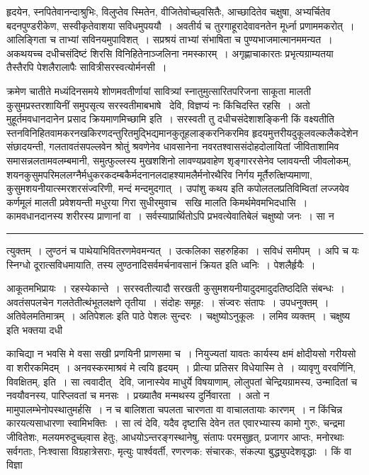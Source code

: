 \documentclass[11pt, openany]{book}
\begin{document}

\newpage
\lfoot{}

\noindent
हृदयेन, स्नपितेवानन्दाश्रुभिः, विलुप्तेव स्मितेन, वीजितेवोच्छ्वसितैः, आच्छादितेव चक्षुषा, अभ्यर्चितेव बदनपुण्डरीकेण, सस्वीकृतेवाशया सविधमुपययौ~। अवतीर्य च तुरगाहूरादेवावनतेन मूर्ध्ना प्रणाममकरोत्~। आलिङ्गिता च ताभ्यां सविनयमुपाविशत्~। सप्रश्रयं ताभ्यां संभाषिता च पुण्यभाजमात्मानममन्यत~। अकथयच्च दधीचसंदिष्टं शिरसि विनिहितेनाञ्जलिना नमस्कारम्~। अगृह्णाचाकारतः प्रभृत्यग्राम्यतया तैस्तैरपि पेशलैरालापैः सावित्रीसरस्वत्योर्मनसी~।

क्रमेण चातीते मध्यंदिनसमये शोणमवतीर्णायां सावित्र्यां स्नातुमुत्सारितपरिजना साकूता मालती कुसुमप्रस्तरशायिनीं समुपसृत्य सरस्वतीमाबभाषे \textendash\ {\haq देवि, विज्ञप्यं नः किंचिदस्ति रहसि~। अतो मुहूर्तमवधानदानेन प्रसाद क्रियमाणमिच्छामि} इति~। सरस्वती तु दधीचसंदेशाशङ्किनी किं वक्ष्यतीति स्तनविनिहितवामकरनखकिरणदन्तुरितमुद्भिद्यमानकुतूहलाङ्करनिकरमिव हृदयमुत्तरीयदुकूलवल्कलैकदेशेन संछादयन्ती, गलतावतंसपल्लवेन श्रोतुं श्रवणेनेव धावसानेना नवरतश्वाससंदोहदोलायितां जीविताशामिव समासन्नलतामवलम्बमानी, समुत्फुल्लस्य मुखशशिनो लावण्यप्रवाहेण शृङ्गाररसेनेव प्लावयन्ती जीवलोकम्, शयनकुसुमपरिमललग्नैर्मधुकरकदम्बकैर्मदनानलदाहश्यामलैर्मनोरथैरिव निर्गय मूर्तैरुत्क्षिप्यमाणा, कुसुमशयनीयात्स्मरशरसंज्वरिणी, मन्दं मन्दमुदगात्~। {\haq उपांशु कथय} इति कपोलतलप्रतिविम्वितां लज्जयेव कर्णमूलं मालती प्रवेशयन्ती मधुरया गिरा सुधीरमुवाच \textendash\ सखि मालति किमर्थमेवमभिदधासि~। कामवधानदानस्य शरीरस्य प्राणानां वा~। सर्वस्याप्रार्थितोऽपि प्रभवत्येवातिबेलं चक्षुष्यो जनः~। सा न

\vspace{2mm}
\hrule

\noindent
{\s त्युक्तम्~। लुण्ठनं च पाथेयाभिवितरणमेवमन्यत्~। उत्कलिका सहरुहिका~। सविधं समीपम्~। अपि च यः स्निग्धो दूरात्सविधमायाति, तस्य लुण्ठनादिसर्वमर्चनावसानं क्रियत इति ध्वनिः~। पेशलैर्हृयैः~।

आकूतमभिप्रायः~। रहस्येकान्ते~। सरस्वतीत्यादौ सरखती कुसुमशयनीयादुदमादुदतिष्ठदिति संबन्धः~। अवतंसपलचेन गलतेतीत्थंभूतलक्षणे तृतीया~। संदोहः समूह:~। संज्वरः संतापः~। उपधनुक्तम्~। अतिवेलमतिमात्रम्~। {\qt अतिपेशलः} इति पाठे पेशलः सुन्दरः~। चक्षुष्योऽनुकूलः~। लमिव व्यक्तम्~। चक्षुष्य इति भक्तया दधी\textendash}

\newpage

\noindent
काचिद्या न भवसि मे वसा सखी प्रणयिनी प्राणसमा च~। नियुज्यतां यावतः कार्यस्य क्षमं क्षोदीयसो गरीयसो वा शरीरकमिदम्~। अनवस्करमाश्रवं मे त्वयि हृदयम्~। प्रीत्या प्रतिसर विधेयास्मि ते~। व्यावृणु वरवर्णिनि, विवक्षितम्, इति~। सा त्ववादीत् \textendash\ देवि, जानास्येव माधुर्ये विषयाणाम्, लोलुपतां चेन्द्रियग्रामस्य, उन्मादितां च नवयौवनस्य, पारिप्लवतां च मनसः~। प्रख्यातैव मन्मथस्य दुर्निवारता~। अतो न मामुपालम्भेनोपस्थातुमर्हसि~। न च बालिशता चपलता चारणता वा वाचालतायाः कारणम्~। न किंचिन्न कारयत्यसाधारणा स्वामिभक्तिः~। सा त्वं देवि, यदैव दृष्टासि देवेन तत एवारभ्यास्य कामो गुरुः, चन्द्रमा जीवितेशः, मलयमरुदुच्छ्वास हेतुः, आधयोऽन्तरङ्गस्थानेषु, संतापः परमसुहृत्, प्रजागर आप्तः, मनोरथाः सर्वगताः, निःश्वासा विग्रहात्रेसराः, मृत्युः पार्श्ववर्ती, रणरणक: संचारकः, संकल्पा बुद्ध्युपदेशवृद्धाः~। किं वा विज्ञा\textendash
\end{document}
